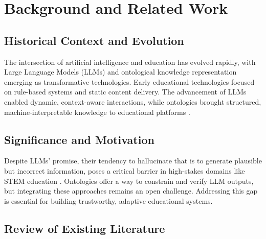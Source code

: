 \chapter{Background and Related Work}
\label{chap:background}


\section{Historical Context and Evolution}

The intersection of artificial intelligence and education has evolved rapidly, with Large Language Models (LLMs) and ontological knowledge representation emerging as transformative technologies. Early educational technologies focused on rule-based systems and static content delivery. The advancement of LLMs enabled dynamic, context-aware interactions, while ontologies brought structured, machine-interpretable knowledge to educational platforms \cite{funk2023neuro}.


\section{Significance and Motivation}

Despite LLMs' promise, their tendency to hallucinate that is to generate plausible but incorrect information, poses a critical barrier in high-stakes domains like STEM education \cite{zhang2024survey, ji2023survey}. Ontologies offer a way to constrain and verify LLM outputs, but integrating these approaches remains an open challenge. Addressing this gap is essential for building trustworthy, adaptive educational systems.


\section{Review of Existing Literature}

